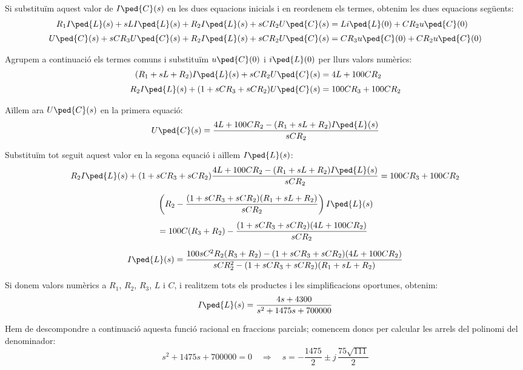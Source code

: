 \begin{exemple}
    Si substituïm aquest valor de $I\ped{C}(s)$ en les dues equacions
    inicials i en reordenem els termes, obtenim les dues equacions següents:
    \begin{align*}
        R_1 I\ped{L}(s) + s L I\ped{L}(s)  + R_2
        I\ped{L}(s) + s C R_2 U\ped{C}(s) &= L i\ped{L}(0) + C R_2 u\ped{C}(0)\\[0.5ex]
        U\ped{C}(s) + s C R_3 U\ped{C}(s) + R_2 I\ped{L}(s) + s C R_2 U\ped{C}(s)
        &= C R_3 u\ped{C}(0) + C R_2 u\ped{C}(0)
    \end{align*}

    Agrupem a continuació els termes comuns i substituïm $u\ped{C}(0)$ i
    $i\ped{L}(0)$ per llurs valors numèrics:
    \begin{align*}
        (R_1 + s L + R_2) I\ped{L}(s) + s C R_2 U\ped{C}(s) &= 4 L  + 100 C R_2\\[0.5ex]
        R_2 I\ped{L}(s) + (1 +s C R_3 + s C R_2) U\ped{C}(s) &= 100 C R_3  + 100 C R_2
    \end{align*}

    Aïllem ara $U\ped{C}(s)$ en la primera equació:
    \[
        U\ped{C}(s) = \frac{4 L  + 100 C R_2 -(R_1 + s L + R_2) I\ped{L}(s)}{s C R_2}
    \]

    Substituïm tot seguit aquest valor en la segona equació i aïllem
    $I\ped{L}(s)$:
    \begin{gather*}
       R_2 I\ped{L}(s) + (1 + s C R_3 + s C R_2) \frac{4 L  + 100 C R_2 - (R_1 + s L + R_2)I\ped{L}(s)}{s C R_2} = 100 C R_3  + 100 C R_2 \\[1.5ex]
       \begin{split} &\left( R_2 - \frac{(1 +s C R_3 + s C R_2)(R_1 + s L + R_2)}{s C R_2} \right) I\ped{L}(s)
        \\[1ex] &= 100 C (R_3  + R_2) - \frac{(1 +s C R_3 + s C R_2)(4 L  + 100 C R_2)}{s C
       R_2}\end{split}\\[1.5ex]
    I\ped{L}(s) = \frac{100 s C^2 R_2(R_3  + R_2)- (1 +s C R_3 + s C
    R_2)(4 L  + 100 C R_2)}{s C R_2^2  -(1 +s C R_3 + s C R_2)(R_1 + s L
    + R_2)}
    \end{gather*}

    Si donem valors numèrics a $R_1$, $R_2$, $R_3$, $L$ i $C$, i
    realitzem tots els productes i les  simplificacions oportunes,
    obtenim:
    \[
    I\ped{L}(s) = \frac{4 s+ 4300}{s^2 +1475 s + 700000}
    \]

    Hem de descompondre a continuació aquesta funció racional en
    fraccions parcials; comencem doncs per calcular les arrels del
    polinomi del denominador:
    \[
    s^2 +1475 s + 700000 = 0 \quad\Rightarrow\quad s= -\frac{1475}{2}
    \pm j\,\frac{75\sqrt{111}}{2}
    \]


\end{exemple}
